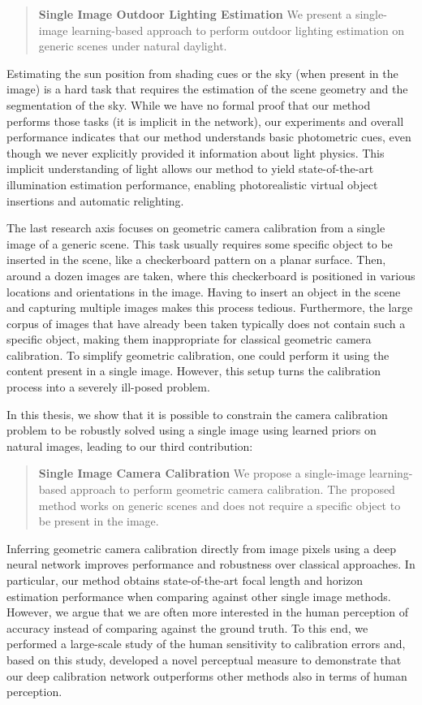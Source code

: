 \begin{quotation}
\textbf{Single Image Outdoor Lighting Estimation} We present a single-image learning-based approach to perform outdoor lighting estimation on generic scenes under natural daylight. 
\end{quotation}

Estimating the sun position from shading cues or the sky (when present in the image) is a hard task that requires the estimation of the scene geometry and the segmentation of the sky. While we have no formal proof that our method performs those tasks (it is implicit in the network), our experiments and overall performance indicates that our method understands basic photometric cues, even though we never explicitly provided it information about light physics. This implicit understanding of light allows our method to yield state-of-the-art illumination estimation performance, enabling photorealistic virtual object insertions and automatic relighting. 

The last research axis focuses on geometric camera calibration from a single image of a generic scene. This task usually requires some specific object to be inserted in the scene, like a checkerboard pattern on a planar surface. Then, around a dozen images are taken, where this checkerboard is positioned in various locations and orientations in the image. Having to insert an object in the scene and capturing multiple images makes this process tedious. Furthermore, the large corpus of images that have already been taken typically does not contain such a specific object, making them inappropriate for classical geometric camera calibration. To simplify geometric calibration, one could perform it using the content present in a single image. However, this setup turns the calibration process into a severely ill-posed problem. 

In this thesis, we show that it is possible to constrain the camera calibration problem to be robustly solved using a single image using learned priors on natural images, leading to our third contribution: 

\begin{quotation}
\textbf{Single Image Camera Calibration} We propose a single-image learning-based approach to perform geometric camera calibration. The proposed method works on generic scenes and does not require a specific object to be present in the image. 
\end{quotation}

Inferring geometric camera calibration directly from image pixels using a deep neural network improves performance and robustness over classical approaches. In particular, our method obtains state-of-the-art focal length and horizon estimation performance when comparing against other single image methods. However, we argue that we are often more interested in the human perception of accuracy instead of comparing against the ground truth. To this end, we performed a large-scale study of the human sensitivity to calibration errors and, based on this study, developed a novel perceptual measure to demonstrate that our deep calibration network outperforms other methods also in terms of human perception. 

